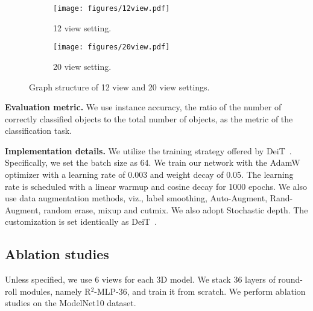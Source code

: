 \documentclass[11pt]{article}
\begin{document}
\begin{figure}[htb!]
\vspace{0.2in}

    \centering
    \begin{subfigure}[b]{0.45\textwidth}
        \centering
        \texttt{[image: figures/12view.pdf]}
        \caption{12 view setting.}
        \label{fig:12-view}
    \end{subfigure}
    \hfill
    \begin{subfigure}[b]{0.45\textwidth}
        \centering
        \texttt{[image: figures/20view.pdf]}
        \caption{20 view setting.}
        \label{fig:20-view}
    \end{subfigure}
\caption{Graph structure of 12 view and 20 view settings.
}
\label{fig:graph}
\end{figure}

\vspace{0.2in}\noindent\textbf{Evaluation metric.} We use instance accuracy, the ratio of the number of correctly classified objects to the total number of objects, as the metric of the classification task.

\vspace{0.2in}\noindent\textbf{Implementation details.} We utilize the training strategy offered by DeiT~\citep{touvron2021training}. Specifically, we set the batch size as 64. We train our network with the AdamW optimizer with a learning rate of 0.003 and weight decay of 0.05. The learning rate is scheduled with a linear warmup and cosine decay for 1000 epochs. We also use data augmentation methods, viz., label smoothing, Auto-Augment, Rand-Augment, random erase, mixup and cutmix. We also adopt Stochastic depth. The customization is set identically as DeiT~\citep{touvron2021training}.


\subsection{Ablation studies}
Unless specified, we use 6 views for each 3D model. We stack 36 layers of round-roll modules, namely R$^2$-MLP-36, and train it from scratch. We perform ablation studies on the ModelNet10 dataset.
\end{document}
